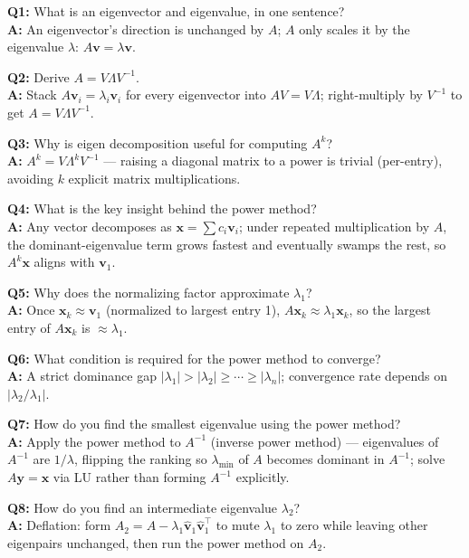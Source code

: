 \begin{qabox}
\textbf{Q1:} What is an eigenvector and eigenvalue, in one sentence? \\
\textbf{A:} An eigenvector's direction is unchanged by $A$; $A$ only scales it by the eigenvalue $\lambda$: $A\mathbf v=\lambda\mathbf v$.

\textbf{Q2:} Derive $A=V\Lambda V^{-1}$. \\
\textbf{A:} Stack $A\mathbf v_i=\lambda_i\mathbf v_i$ for every eigenvector into $AV=V\Lambda$; right-multiply by $V^{-1}$ to get $A=V\Lambda V^{-1}$.

\textbf{Q3:} Why is eigen decomposition useful for computing $A^k$? \\
\textbf{A:} $A^k=V\Lambda^kV^{-1}$ — raising a diagonal matrix to a power is trivial (per-entry), avoiding $k$ explicit matrix multiplications.

\textbf{Q4:} What is the key insight behind the power method? \\
\textbf{A:} Any vector decomposes as $\mathbf x=\sum c_i\mathbf v_i$; under repeated multiplication by $A$, the dominant-eigenvalue term grows fastest and eventually swamps the rest, so $A^k\mathbf x$ aligns with $\mathbf v_1$.

\textbf{Q5:} Why does the normalizing factor approximate $\lambda_1$? \\
\textbf{A:} Once $\mathbf x_k\approx\mathbf v_1$ (normalized to largest entry 1), $A\mathbf x_k\approx\lambda_1\mathbf x_k$, so the largest entry of $A\mathbf x_k$ is $\approx\lambda_1$.

\textbf{Q6:} What condition is required for the power method to converge? \\
\textbf{A:} A strict dominance gap $|\lambda_1|>|\lambda_2|\ge\cdots\ge|\lambda_n|$; convergence rate depends on $|\lambda_2/\lambda_1|$.

\textbf{Q7:} How do you find the smallest eigenvalue using the power method? \\
\textbf{A:} Apply the power method to $A^{-1}$ (inverse power method) — eigenvalues of $A^{-1}$ are $1/\lambda$, flipping the ranking so $\lambda_{\min}$ of $A$ becomes dominant in $A^{-1}$; solve $A\mathbf y=\mathbf x$ via LU rather than forming $A^{-1}$ explicitly.

\textbf{Q8:} How do you find an intermediate eigenvalue $\lambda_2$? \\
\textbf{A:} Deflation: form $A_2=A-\lambda_1\hat{\mathbf v}_1\hat{\mathbf v}_1^\top$ to mute $\lambda_1$ to zero while leaving other eigenpairs unchanged, then run the power method on $A_2$.


\end{qabox}
